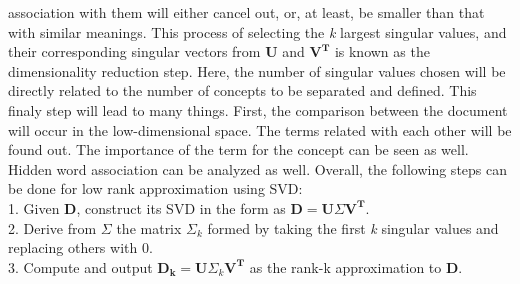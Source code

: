 \documentclass[12pt]{report}
\begin{document}
        association with them will either cancel out, or, at least, be smaller than that with similar meanings.
        This process of selecting the \emph{k} largest singular values, and their corresponding singular vectors from \textbf{U} and ${\mathbf{V^T}}$ is known as the dimensionality reduction step.
        Here, the number of singular values chosen will be directly related to the number of concepts to be separated and defined.
        This finaly step will lead to many things. First, the comparison between the document will occur in the low-dimensional space. The terms related with each other will be found out.
        The importance of the term for the concept can be seen as well. Hidden word association can be analyzed as well.
        Overall, the following steps can be done for low rank approximation using SVD:\\
        1. Given \textbf{D}, construct its SVD in the form as ${\mathbf{D} = \mathbf{U} \Sigma  \mathbf{V^T}}$.\\
        2. Derive from ${\Sigma}$ the matrix ${\Sigma_k}$ formed by taking the first \emph{k} singular values and replacing others with 0.\\
        3. Compute and output ${\mathbf{D_k} = \mathbf{U} \Sigma_k  \mathbf{V^T}}$ as the rank-k approximation to \textbf{D}.\cite{cambridge2009online}
\end{document}
